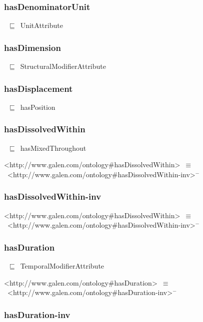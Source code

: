 \documentclass{article}
\begin{document}
\subsubsection*{hasDenominatorUnit}

~\ensuremath{\sqsubseteq}~UnitAttribute

\subsubsection*{hasDimension}

~\ensuremath{\sqsubseteq}~StructuralModifierAttribute

\subsubsection*{hasDisplacement}

~\ensuremath{\sqsubseteq}~hasPosition

\subsubsection*{hasDissolvedWithin}

~\ensuremath{\sqsubseteq}~hasMixedThroughout

<http://www.galen.com/ontology#hasDissolvedWithin>~\ensuremath{\equiv}~<http://www.galen.com/ontology#hasDissolvedWithin-inv>\ensuremath{^-}

\subsubsection*{hasDissolvedWithin-inv}

<http://www.galen.com/ontology#hasDissolvedWithin>~\ensuremath{\equiv}~<http://www.galen.com/ontology#hasDissolvedWithin-inv>\ensuremath{^-}

\subsubsection*{hasDuration}

~\ensuremath{\sqsubseteq}~TemporalModifierAttribute

<http://www.galen.com/ontology#hasDuration>~\ensuremath{\equiv}~<http://www.galen.com/ontology#hasDuration-inv>\ensuremath{^-}

\subsubsection*{hasDuration-inv}
\end{document}
